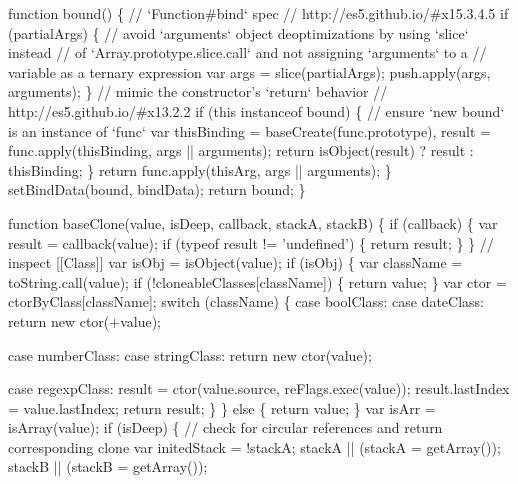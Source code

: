 \begin{DoxyCodeInclude}
      \textcolor{keyword}{function} bound() \{
        \textcolor{comment}{// `Function#bind` spec}
        \textcolor{comment}{// http://es5.github.io/#x15.3.4.5}
        \textcolor{keywordflow}{if} (partialArgs) \{
          \textcolor{comment}{// avoid `arguments` object deoptimizations by using `slice` instead}
          \textcolor{comment}{// of `Array.prototype.slice.call` and not assigning `arguments` to a}
          \textcolor{comment}{// variable as a ternary expression}
          var args = slice(partialArgs);
          push.apply(args, arguments);
        \}
        \textcolor{comment}{// mimic the constructor's `return` behavior}
        \textcolor{comment}{// http://es5.github.io/#x13.2.2}
        \textcolor{keywordflow}{if} (\textcolor{keyword}{this} instanceof bound) \{
          \textcolor{comment}{// ensure `new bound` is an instance of `func`}
          var thisBinding = baseCreate(func.prototype),
              result = func.apply(thisBinding, args || arguments);
          \textcolor{keywordflow}{return} isObject(result) ? result : thisBinding;
        \}
        \textcolor{keywordflow}{return} func.apply(thisArg, args || arguments);
      \}
      setBindData(bound, bindData);
      \textcolor{keywordflow}{return} bound;
    \}

    \textcolor{keyword}{function} baseClone(value, isDeep, callback, stackA, stackB) \{
      \textcolor{keywordflow}{if} (callback) \{
        var result = callback(value);
        \textcolor{keywordflow}{if} (typeof result != \textcolor{stringliteral}{'undefined'}) \{
          \textcolor{keywordflow}{return} result;
        \}
      \}
      \textcolor{comment}{// inspect [[Class]]}
      var isObj = isObject(value);
      \textcolor{keywordflow}{if} (isObj) \{
        var className = toString.call(value);
        \textcolor{keywordflow}{if} (!cloneableClasses[className]) \{
          \textcolor{keywordflow}{return} value;
        \}
        var ctor = ctorByClass[className];
        \textcolor{keywordflow}{switch} (className) \{
          \textcolor{keywordflow}{case} boolClass:
          \textcolor{keywordflow}{case} dateClass:
            \textcolor{keywordflow}{return} \textcolor{keyword}{new} ctor(+value);

          \textcolor{keywordflow}{case} numberClass:
          \textcolor{keywordflow}{case} stringClass:
            \textcolor{keywordflow}{return} \textcolor{keyword}{new} ctor(value);

          \textcolor{keywordflow}{case} regexpClass:
            result = ctor(value.source, reFlags.exec(value));
            result.lastIndex = value.lastIndex;
            \textcolor{keywordflow}{return} result;
        \}
      \} \textcolor{keywordflow}{else} \{
        \textcolor{keywordflow}{return} value;
      \}
      var isArr = isArray(value);
      \textcolor{keywordflow}{if} (isDeep) \{
        \textcolor{comment}{// check for circular references and return corresponding clone}
        var initedStack = !stackA;
        stackA || (stackA = getArray());
        stackB || (stackB = getArray());


\end{DoxyCodeInclude}
